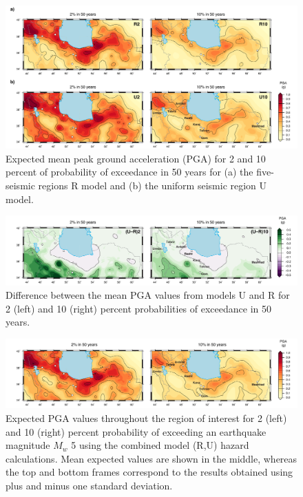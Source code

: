 \begin{figure}[t]
    \centering
    \includegraphics[width=\textwidth]{figures/pdf/figure-10.pdf}
    \caption{Expected mean peak ground acceleration (PGA) for 2 and 10 percent of probability of exceedance in 50 years for (a) the five-seismic regions R model and (b) the uniform seismic region U model.}
    \label{fig:pga}
\end{figure}

\begin{figure}[t]
    \centering
    \includegraphics[width=\textwidth]{figures/pdf/figure-11.pdf}
    \caption{Difference between the mean PGA values from models U and R for 2 (left) and 10 (right) percent probabilities of exceedance in 50 years.}
    \label{fig:pga.diff}
\end{figure}

\begin{figure}[t]
    \centering
    \includegraphics[width=\textwidth]{figures/pdf/figure-12.pdf}
    \caption{Expected PGA values throughout the region of interest for 2 (left) and 10 (right) percent probability of exceeding an earthquake magnitude $M_w$ 5 using the combined model (R,U) hazard calculations. Mean expected values are shown in the middle, whereas the top and bottom frames correspond to the results obtained using plus and minus one standard deviation.}
    \label{fig:pga.ru.std}
\end{figure}

